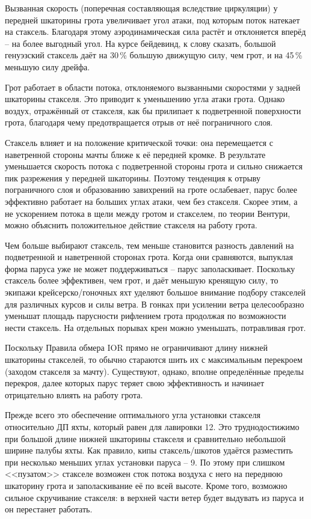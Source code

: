 Вызванная скорость (поперечная составляющая вследствие циркуляции) у
передней шкаторины грота увеличивает угол атаки, под которым поток
натекает на стаксель. Благодаря этому аэродинамическая сила растёт и
отклоняется вперёд \--- на более выгодный угол. На курсе бейдевинд, к
слову сказать, большой генуэзский стаксель даёт на 30\,\% большую
движущую силу, чем грот, и на 45\,\% меньшую силу дрейфа.
 
Грот работает в области потока, отклоняемого вызванными скоростями у
задней шкаторины стакселя. Это приводит к уменьшению угла атаки
грота. Однако воздух, отражённый от стакселя, как бы прилипает к
подветренной поверхности грота, благодаря чему предотвращается отрыв
от неё пограничного слоя.

Стаксель влияет и на положение критической точки: она перемещается с
наветренной стороны мачты ближе к её передней кромке. В результате
уменьшается скорость потока с подветренной стороны грота и сильно
снижается пик разрежения у передней шкаторины. Поэтому тенденция к
отрыву пограничного слоя и образованию завихрений на гроте ослабевает,
парус более эффективно работает на больших углах атаки, чем без
стакселя. Скорее этим, а не ускорением потока в щели между гротом и
стакселем, по теории Вентури, можно объяснить положительное действие
стакселя на работу грота.

Чем больше выбирают стаксель, тем меньше становится разность давлений
на подветренной и наветренной сторонах грота. Когда они сравняются,
выпуклая форма паруса уже не может поддерживаться \--- парус
заполаскивает. Поскольку стаксель более эффективен, чем грот, и даёт
меньшую кренящую силу, то экипажи крейсерско\-/гоночных яхт уделяют
большое внимание подбору стакселей для различных курсов и силы
ветра. В гонках при усилении ветра целесообразно уменьшат площадь
парусности рифлением грота продолжая по возможности нести стаксель. На
отдельных порывах крен можно уменьшать, потравливая грот.

Поскольку Правила обмера IOR прямо не ограничивают длину нижней
шкаторины стакселей, то обычно стараются шить их с максимальным
перекроем (заходом стакселя за мачту). Существуют, однако, вполне
определённые пределы перекроя, далее которых парус теряет свою
эффективность и начинает отрицательно влиять на работу грота.

Прежде всего это обеспечение оптимального угла установки стакселя
относительно ДП яхты, который равен для лавировки 12\gr. Это
труднодостижимо при большой длине нижней шкаторины стакселя и
сравнительно небольшой ширине палубы яхты. Как правило, кипы
стаксель\-/шкотов удаётся разместить при несколько меньших углах
установки паруса \--- 9\gr. По этому при слишком <<пузатом>>
стакселе возможен сток потока воздуха с него на переднюю шкаторину
грота и заполаскивание её по всей высоте. Кроме того, возможно сильное
скручивание стакселя: в верхней части ветер будет выдувать из паруса и
он перестанет работать.


